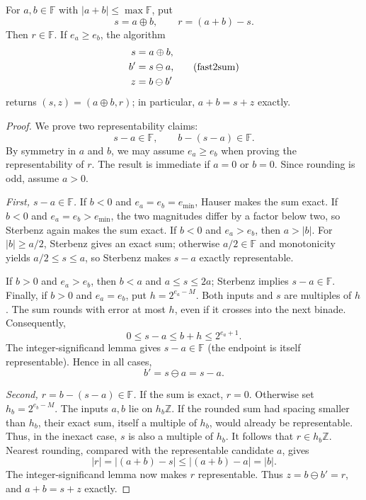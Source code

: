 \begin{theorem}
For $a, b\in\mathbb F$ with $|a+b|\le\max\mathbb F$, put
\[
 s=a\oplus b, \qquad r=(a+b)-s.
\]
Then $r\in\mathbb F$. If $e_a\ge e_b$, the algorithm
\[
 \begin{aligned}
 s&=a\oplus b, \\
 b'&=s\ominus a, \\
 z&=b\ominus b'
 \end{aligned}
 \qquad(\operatorname{fast2sum})
\]
returns $(s, z)=(a\oplus b, r)$; in particular,
$a+b=s+z$ exactly.
\end{theorem}
\begin{proof}
We prove two representability claims:
\[
 s-a\in\mathbb F, \qquad b-(s-a)\in\mathbb F.
\]
By symmetry in $a$ and $b$, we may assume $e_a\ge e_b$ when
proving the representability of $r$. The result is immediate if
$a=0$ or $b=0$. Since rounding is odd, assume $a>0$.

\emph{First, $s-a\in\mathbb F$.}
If $b<0$ and $e_a=e_b=e_{\min}$, Hauser makes the sum exact.
If $b<0$ and $e_a=e_b>e_{\min}$, the two magnitudes differ
by a factor below two, so Sterbenz again makes the sum exact.
If $b<0$ and $e_a>e_b$, then $a>|b|$. For $|b|\ge a/2$,
Sterbenz gives an exact sum; otherwise $a/2\in\mathbb F$ and
monotonicity yields $a/2\le s\le a$, so Sterbenz makes
$s-a$ exactly representable.

If $b>0$ and $e_a>e_b$, then $b<a$ and
$a\le s\le2a$; Sterbenz implies $s-a\in\mathbb F$.
Finally, if $b>0$ and $e_a=e_b$, put $h=2^{e_a-M}$.
Both inputs and $s$ are multiples of $h$. The sum rounds
with error at most $h$, even if it crosses into the next binade.
Consequently,
\[
 0\le s-a\le b+h\le2^{e_a+1}.
\]
The integer-significand lemma gives $s-a\in\mathbb F$
(the endpoint is itself representable). Hence in all cases,
\[
 b'=s\ominus a=s-a.
\]

\emph{Second, $r=b-(s-a)\in\mathbb F$.}
If the sum is exact, $r=0$. Otherwise set
$h_b=2^{e_b-M}$. The inputs $a, b$ lie on $h_b\mathbb Z$.
If the rounded sum had spacing smaller than $h_b$, their
exact sum, itself a multiple of $h_b$, would already be
representable. Thus, in the inexact case, $s$ is also a
multiple of $h_b$. It follows that $r\in h_b\mathbb Z$.
Nearest rounding, compared with the representable candidate
$a$, gives
\[
 |r|=|(a+b)-s|\le|(a+b)-a|=|b|.
\]
The integer-significand lemma now makes $r$ representable.
Thus $z=b\ominus b'=r$, and $a+b=s+z$ exactly.
\end{proof}

